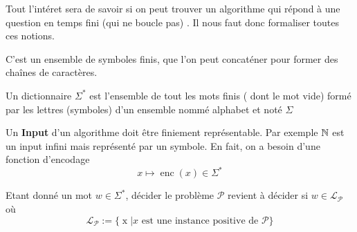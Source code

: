 \begin{centering}


\end{centering}

Tout l'intéret sera de savoir si on peut trouver un algorithme qui répond à une question en temps fini (qui ne boucle pas) .
Il nous faut donc formaliser toutes ces notions. 

\begin{definition}[mot]
    C'est un ensemble de symboles finis, que l'on peut concaténer pour former des chaînes de caractères.
\end{definition}

\begin{definition}
    Un dictionnaire $\Sigma^*$ est l'ensemble de tout les mots finis ( dont le mot vide) formé par les lettres (symboles) d'un ensemble nommé alphabet et noté $\Sigma$
\end{definition}

Un \textbf{Input} d'un algorithme doit être finiement représentable. Par exemple $\mathbb{N}$ est un input infini mais représenté par un symbole.
En fait, on a besoin d'une fonction d'encodage 
$$
x\mapsto \operatorname{enc}(x)\in \Sigma^*
$$

Etant donné un mot $w\in \Sigma^*$, décider le problème $\mathcal{P}$
revient à décider si $w\in \mathcal{L}_\mathcal{P}$ où
$$
\mathcal{L}_\mathcal{P} := \{\operatorname{x} | x \text{ est une instance positive de }\mathcal{P}\}
$$


